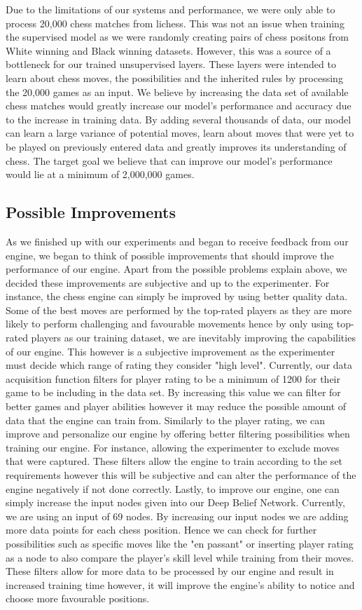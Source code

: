 \documentclass[12pt]{article}
\begin{document}
    Due to the limitations of our systems and performance, we were only able to process 20,000 chess matches from lichess. This was not an issue when training the supervised model as we were randomly creating pairs of chess positons from White winning and Black winning datasets. However, this was a source of a bottleneck for our trained unsupervised layers. These layers were intended to learn about chess moves, the possibilities and the inherited rules by processing the 20,000 games as an input. We believe by increasing the data set of available chess matches would greatly increase our model's performance and accuracy due to the increase in training data. By adding several thousands of data, our model can learn a large variance of potential moves, learn about moves that were yet to be played on previously entered data and greatly improves its understanding of chess. The target goal we believe that can improve our model's performance would lie at a minimum of 2,000,000 games. 

    \subsection{Possible Improvements}
    As we finished up with our experiments and began to receive feedback from our engine, we began to think of possible improvements that should improve the performance of our engine. Apart from the possible problems explain above, we decided these improvements are subjective and up to the experimenter. For instance, the chess engine can simply be improved by using better quality data. Some of the best moves are performed by the top-rated players as they are more likely to perform challenging and favourable movements hence by only using top-rated players as our training dataset, we are inevitably improving the capabilities of our engine. This however is a subjective improvement as the experimenter must decide which range of rating they consider "high level". Currently, our data acquisition function filters for player rating to be a minimum of 1200 for their game to be including in the data set. By increasing this value we can filter for better games and player abilities however it may reduce the possible amount of data that the engine can train from. Similarly to the player rating, we can improve and personalize our engine by offering better filtering possibilities when training our engine. For instance, allowing the experimenter to exclude moves that were captured. These filters allow the engine to train according to the set requirements however this will be subjective and can alter the performance of the engine negatively if not done correctly. Lastly, to improve our engine, one can simply increase the input nodes given into our Deep Belief Network. Currently, we are using an input of 69 nodes. By increasing our input nodes we are adding more data points for each chess position. Hence we can check for further possibilities such as specific moves like the "en passant" or inserting player rating as a node to also compare the player's skill level while training from their moves. These filters allow for more data to be processed by our engine and result in increased training time however, it will improve the engine's ability to notice and choose more favourable positions. 
\end{document}
